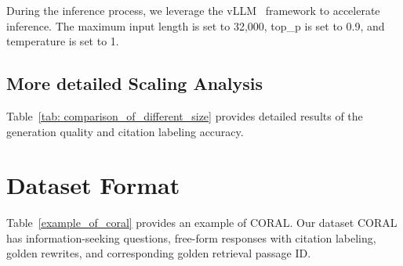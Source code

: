 \documentclass[11pt]{article}
\begin{document}
During the inference process, we leverage the vLLM~\citep{kwon2023efficient} framework to accelerate inference.  The maximum input length is set to 32,000, top\_p is set to 0.9, and temperature is set to 1.





\subsection{More detailed Scaling Analysis}
Table~\ref{tab: comparison_of_different_size} provides detailed results of the generation quality and citation labeling accuracy.

\section{Dataset Format}
Table~\ref{example_of_coral} provides an example of CORAL. Our dataset CORAL has information-seeking questions, free-form responses with citation labeling, golden rewrites, and corresponding golden retrieval passage ID.
\end{document}
